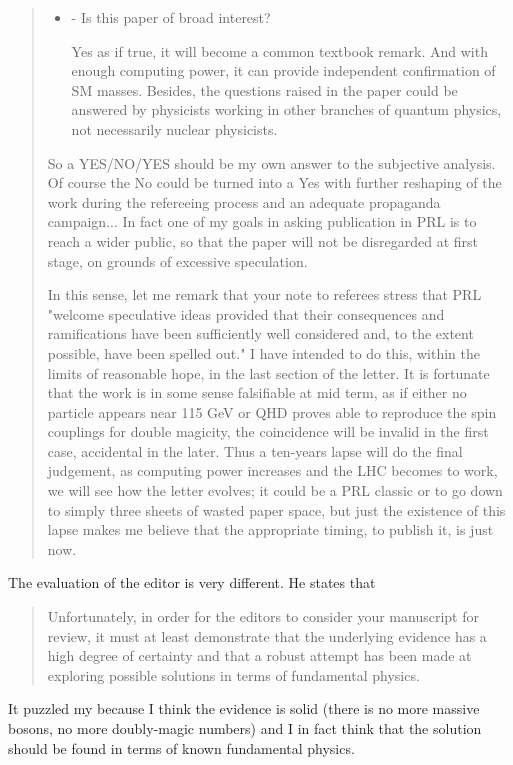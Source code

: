 \documentclass{letter}
\begin{document}
\begin{quote}
\begin{itemize}
\item {- Is this paper of broad interest?}

Yes as if true, it will become a common textbook remark. And with enough 
computing power, it can provide independent confirmation of SM masses. 
Besides, the questions raised in the paper could be answered by physicists 
working in other branches of quantum physics, not necessarily nuclear 
physicists.

\end{itemize}
So a YES/NO/YES should be my own answer to the subjective analysis. Of course 
the No could be turned into a Yes with further reshaping of the work during 
the refereeing process and an adequate propaganda campaign... In fact one of 
my goals in asking publication in PRL is to reach a wider public, so that the 
paper will not be disregarded at first stage, on grounds of excessive 
speculation.

In this sense, let me remark that your note to referees stress that PRL 
"welcome speculative ideas provided that their consequences and ramifications 
have been sufficiently well considered and, to the extent possible, have been 
spelled out." I have intended to do this, within the limits of reasonable 
hope, in the last section of the letter.  It is fortunate that the work is in 
some sense falsifiable at mid term, as if either no particle appears near 115 
GeV or QHD proves able to reproduce the spin couplings for double magicity, 
the coincidence will be invalid in the first case, accidental in the later. 
Thus a ten-years lapse will do the final judgement, as computing power 
increases and the LHC becomes to work, we will see how the letter evolves; it 
could be a PRL classic or to go down to simply three sheets of wasted paper 
space, but just the existence of
this lapse makes me believe that the appropriate timing, to publish it, is 
just now.

\end{quote}

The evaluation of the editor is very different. He states that
\begin{quote}
Unfortunately, in order for the editors to consider
your manuscript for review, it must at least demonstrate that the
underlying evidence has a high degree of certainty and that a robust
attempt has been made at exploring possible solutions in terms of
fundamental physics.
\end{quote}

It puzzled my because I think the evidence is solid (there is no more massive
bosons, no more doubly-magic numbers) and I in fact think that the solution
should be found in terms of known fundamental physics.
\end{document}
